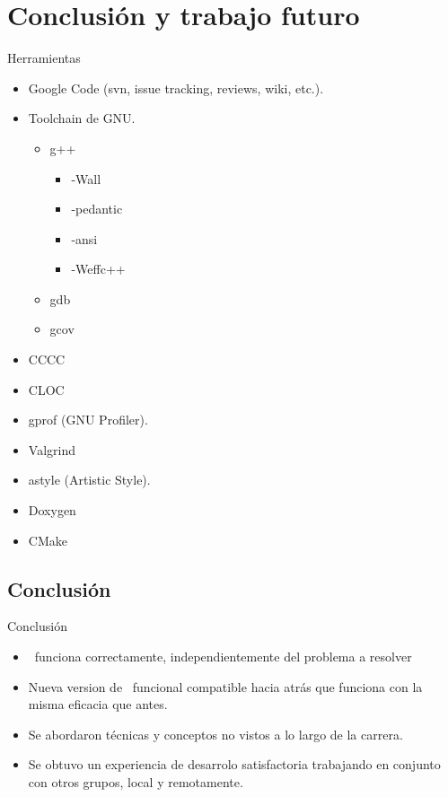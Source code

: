 \section{Conclusión y trabajo futuro}

\begin{frame}{Herramientas}
\begin{itemize}
\item Google Code (svn, issue tracking, reviews, wiki, etc.).
\item Toolchain de GNU.
\begin{itemize}
    \item g++
    \begin{itemize}
    \item -Wall
    \item -pedantic
    \item -ansi
    \item -Weffc++
    \end{itemize}
    \item gdb
    \item gcov
\end{itemize}
\item CCCC
\item CLOC
\item gprof (GNU Profiler).
\item Valgrind
\item astyle (Artistic Style).
\item Doxygen
\item CMake
\end{itemize}

\end{frame}


\subsection{Conclusión}

\begin{frame}{Conclusión}

    \begin{itemize}
     \item \rc\ funciona correctamente, independientemente del problema a resolver
     \item Nueva version de \fud\ funcional compatible hacia atrás que funciona con la misma eficacia que antes.
     \item Se abordaron técnicas y conceptos no vistos a lo largo de la carrera.
     \item Se obtuvo un experiencia de desarrolo satisfactoria trabajando en conjunto con otros grupos, local y remotamente.
    \end{itemize}

\end{frame}


